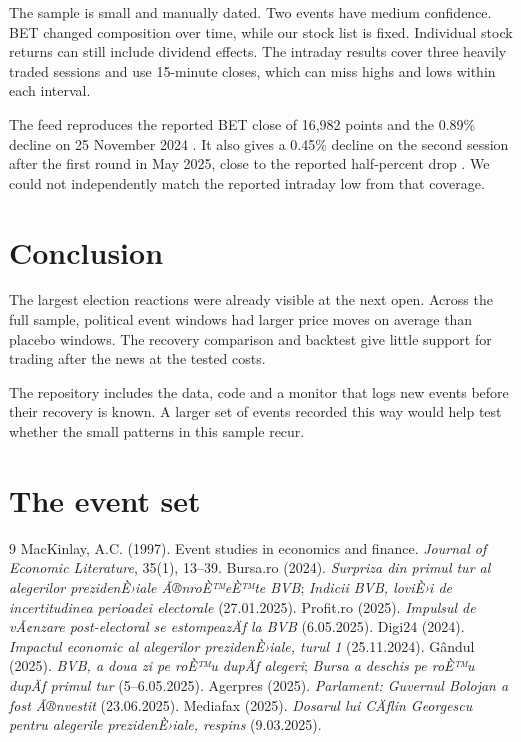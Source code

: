 \documentclass[11pt,a4paper]{article}
\begin{document}
The sample is small and manually dated. Two events have medium confidence.
BET changed composition over time, while our stock list is fixed. Individual
stock returns can still include dividend effects. The intraday results cover
three heavily traded sessions and use 15-minute closes, which can miss highs
and lows within each interval.

The feed reproduces the reported BET close of 16,982 points and the 0.89\%
decline on 25 November 2024 \cite{bursa}. It also gives a 0.45\% decline on
the second session after the first round in May 2025, close to the reported
half-percent drop \cite{profit}. We could not independently match the
reported intraday low from that coverage.

\section{Conclusion}

The largest election reactions were already visible at the next open.
Across the full sample, political event windows had larger price moves on
average than placebo windows. The recovery comparison and backtest give
little support for trading after the news at the tested costs.

The repository includes the data, code and a monitor that logs new events
before their recovery is known. A larger set of events recorded this way
would help test whether the small patterns in this sample recur.


\appendix
\section{The event set}
\begin{table}[H]
\centering
\caption{Events in the input table.}
\label{tab:events}
{\footnotesize\setlength{\tabcolsep}{4pt}}
\end{table}

\begin{thebibliography}{9}
 MacKinlay, A.C. (1997). Event studies in economics and finance. \emph{Journal of Economic Literature}, 35(1), 13--39.
 Bursa.ro (2024). \emph{Surpriza din primul tur al alegerilor prezidenÈ›iale Ã®nroÈ™eÈ™te BVB}; \emph{Indicii BVB, loviÈ›i de incertitudinea perioadei electorale} (27.01.2025).
 Profit.ro (2025). \emph{Impulsul de vÃ¢nzare post-electoral se estompeazÄƒ la BVB} (6.05.2025).
 Digi24 (2024). \emph{Impactul economic al alegerilor prezidenÈ›iale, turul 1} (25.11.2024).
 G\^andul (2025). \emph{BVB, a doua zi pe roÈ™u dupÄƒ alegeri}; \emph{Bursa a deschis pe roÈ™u dupÄƒ primul tur} (5--6.05.2025).
 Agerpres (2025). \emph{Parlament: Guvernul Bolojan a fost Ã®nvestit} (23.06.2025).
 Mediafax (2025). \emph{Dosarul lui CÄƒlin Georgescu pentru alegerile prezidenÈ›iale, respins} (9.03.2025).
\end{thebibliography}
\end{document}

